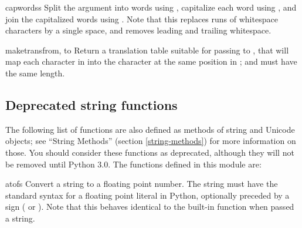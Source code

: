 \begin{funcdesc}{capwords}{s}
  Split the argument into words using , capitalize
  each word using , and join the capitalized
  words using .  Note that this replaces runs of
  whitespace characters by a single space, and removes leading and
  trailing whitespace.
\end{funcdesc}

\begin{funcdesc}{maketrans}{from, to}
  Return a translation table suitable for passing to
  , that will map
  each character in  into the character at the same position
  in ;  and  must have the same length.

\end{funcdesc}

\subsection{Deprecated string functions}

The following list of functions are also defined as methods of string and
Unicode objects; see ``String Methods'' (section
\ref{string-methods}) for more information on those.  You should consider
these functions as deprecated, although they will not be removed until Python
3.0.  The functions defined in this module are:

\begin{funcdesc}{atof}{s}
  Convert a string to a floating point number.  The string must have
  the standard syntax for a floating point literal in Python,
  optionally preceded by a sign (\samp{+} or \samp{-}).  Note that
  this behaves identical to the built-in function
   when passed a string.

\end{funcdesc}

